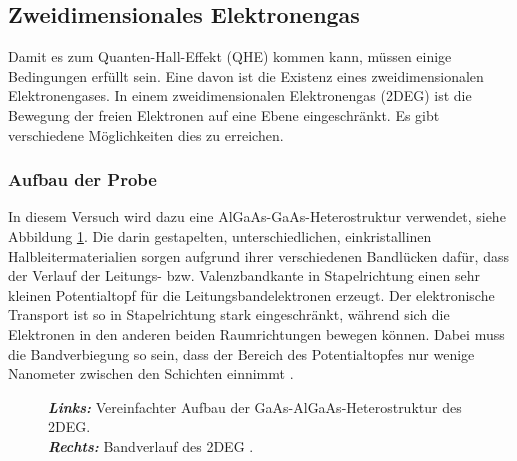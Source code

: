 
\subsection{Zweidimensionales Elektronengas}

Damit es zum Quanten-Hall-Effekt (QHE) kommen kann, müssen einige Bedingungen erfüllt sein. Eine davon ist die Existenz eines zweidimensionalen Elektronengases.
In einem zweidimensionalen Elektronengas (2DEG) ist die Bewegung der freien Elektronen auf eine Ebene eingeschränkt. Es gibt verschiedene Möglichkeiten dies zu erreichen. 
\subsubsection{Aufbau der Probe}
In diesem Versuch wird dazu eine AlGaAs-GaAs-Heterostruktur verwendet, siehe Abbildung \ref{fig:Proben_Aufbau}. Die darin gestapelten, unterschiedlichen, einkristallinen Halbleitermaterialien sorgen aufgrund ihrer verschiedenen Bandlücken dafür, dass der Verlauf der Leitungs- bzw. Valenzbandkante in Stapelrichtung einen sehr kleinen Potentialtopf für die Leitungsbandelektronen erzeugt. Der elektronische Transport ist so in Stapelrichtung stark eingeschränkt, während sich die Elektronen in den anderen beiden Raumrichtungen bewegen können. Dabei muss die Bandverbiegung so sein, dass der Bereich des Potentialtopfes nur wenige Nanometer zwischen den Schichten einnimmt  \cite[Kap.8 a]{weisbuch_quantum_1991}.


\begin{figure}[h]
	\centering
	\caption[2DEG Schicht]{
		\textit{\textbf{Links:}} Vereinfachter Aufbau der GaAs-AlGaAs-Heterostruktur des 2DEG.\\
		\textit{\textbf{Rechts:}} Bandverlauf des 2DEG \cite{anleitung}.
	}
	\label{fig:Proben_Aufbau}
\end{figure}

